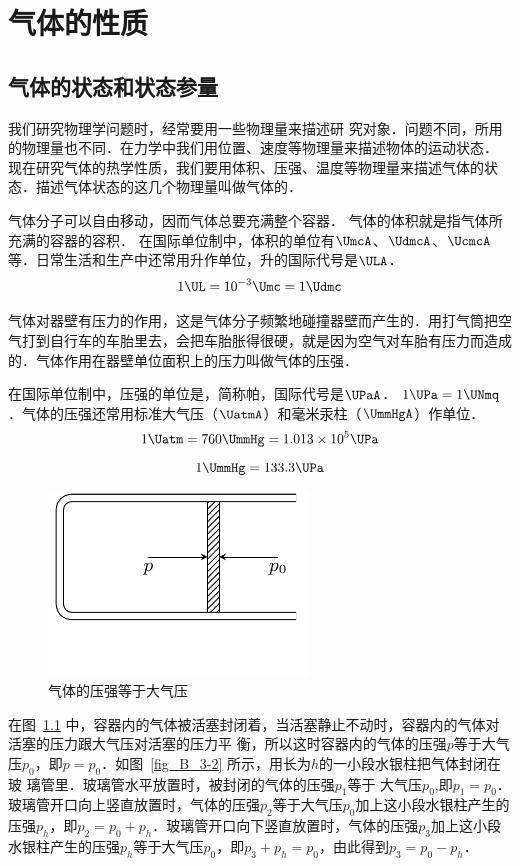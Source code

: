\chapter{气体的性质}\label{chapter-properties-of-gases}


\section{气体的状态和状态参量}
我们研究物理学问题时，经常要用一些物理量来描述研
究对象．问题不同，所用的物理量也不同．在力学中我们用位置、速度等物理量来描述物体的运动状态．
现在研究气体的热学性质，我们要用体积、压强、温度等物理量来描述气体的状态．描述气体状态的这几个物理量叫做气体的．

气体分子可以自由移动，因而气体总要充满整个容器．
气体的体积就是指气体所充满的容器的容积．
在国际单位制中，体积的单位有$ \UmcA $、$\UdmcA$、$ \UcmcA$等．日常生活和生产中还常用升作单位，升的国际代号是$\ULA$．
\[1 \UL =10^{-3} \Umc =1 \Udmc\]

气体对器壁有压力的作用，这是气体分子频繁地碰撞器壁而产生的．用打气筒把空气打到自行车的车胎里去，会把车胎胀得很硬，就是因为空气对车胎有压力而造成的．气体作用在器壁单位面积上的压力叫做气体的压强．

在国际单位制中，压强的单位是，简称帕，国际代号是$\UPaA$．
$1 \UPa=1 \UNmq$．气体的压强还常用标准大气压（$\UatmA$）和毫米汞柱（$\UmmHgA$）作单位．
\[1 \Uatm =760 \UmmHg=1.013\times 10^5 \UPa \]
\[1 \UmmHg =133.3 \UPa \]

\begin{figure}[htbp]
    \centering
    \includegraphics{fig/B/3-1.pdf}
    \caption{气体的压强等于大气压}\label{fig_B_3-1}
\end{figure}



在图~\ref{fig_B_3-1} 中，容器内的气体被活塞封闭着，当活塞静止不动时，容器内的气体对活塞的压力跟大气压对活塞的压力平
衡，所以这时容器内的气体的压强$p$等于大气压$p_0$，即$p=p_0$．如图~\ref{fig_B_3-2} 所示，用长为$h$的一小段水银柱把气体封闭在玻
璃管里．玻璃管水平放置时，被封闭的气体的压强$p_1$等于
大气压$p_0$,即$p_1=p_0$．玻璃管开口向上竖直放置时，气体的压强$p_2$等于大气压$p_0$加上这小段水银柱产生的压强$p_h$，即$p_2=p_0+p_h$．玻璃管开口向下竖直放置时，气体的压强$p_3$加上这小段水银柱产生的压强$p_h$等于大气压$p_0$，即$p_3+p_h=p_0$，由此得到$p_3=p_0-p_h$．


